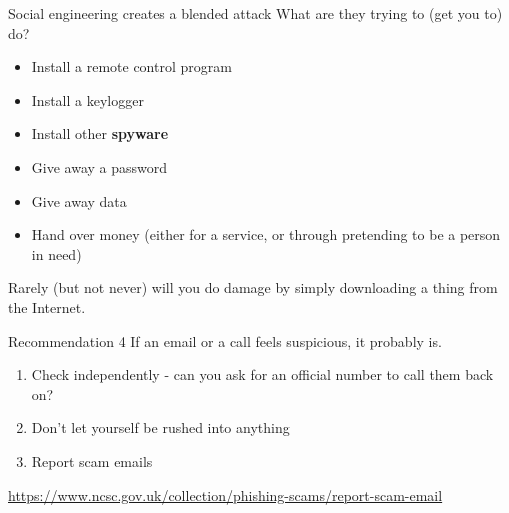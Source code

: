 \documentclass[xcolor=table]{beamer}
\begin{document}
\begin{frame}{Social engineering creates a blended attack}
	What are they trying to (get you to) do? 

	\begin{itemize}
		\item Install a remote control program
		\item Install a keylogger
		\item Install other \textbf{spyware}
		\item Give away a password
		\item Give away data
		\item Hand over money (either for a service,
			or through pretending to be a person
			in need)
	\end{itemize}
		

	
	\vspace{0.5em}

	Rarely (but not never) will you do damage by simply downloading a thing from the Internet. 
\end{frame}

\begin{frame}{Recommendation 4}
	If an email or a call feels suspicious, it probably is.

	\begin{enumerate}
		\item Check independently - can you ask for an official number to call them back on?
		\item Don't let yourself be rushed into anything
		\item Report scam emails
	\end{enumerate}
	\url{https://www.ncsc.gov.uk/collection/phishing-scams/report-scam-email}
	\end{frame}
\end{document}
